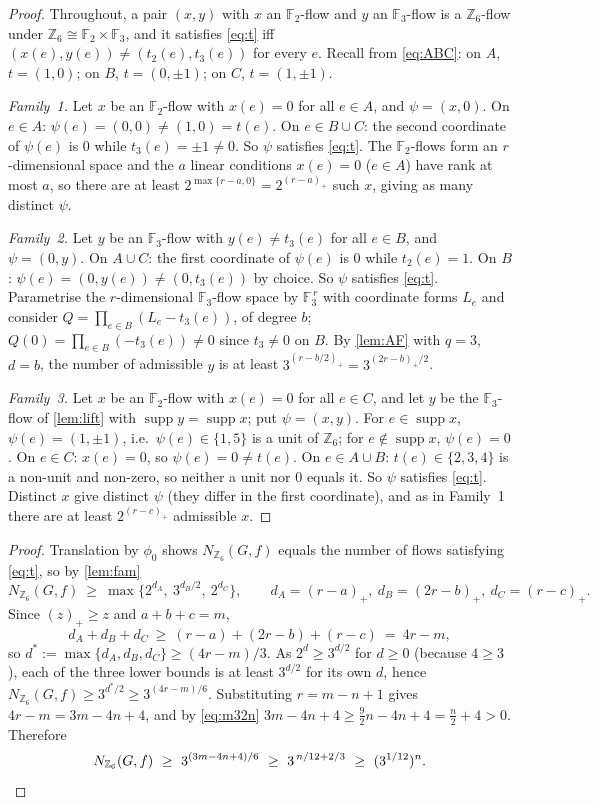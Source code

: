\documentclass[11pt,a4paper]{article}
\theoremstyle{plain}
\theoremstyle{definition}
\theoremstyle{remark}
\newcommand{\F}{{\mathbb F}}
\newcommand{\Z}{{\mathbb Z}}
\newcommand{\Nf}{N}
\DeclareMathOperator{\supp}{supp}
\newcommand{\pos}[1]{(#1)_{+}}
\begin{document}
\label{pf:fam}
\lemfam*
\begin{proof}
Throughout, a pair $(x,y)$ with $x$ an $\F_2$-flow and $y$ an $\F_3$-flow is a $\Z_6$-flow under $\Z_6\cong\F_2\times\F_3$, and it satisfies \eqref{eq:t} iff $(x(e),y(e))\ne(t_2(e),t_3(e))$ for every $e$. Recall from \eqref{eq:ABC}: on $A$, $t=(1,0)$; on $B$, $t=(0,\pm1)$; on $C$, $t=(1,\pm1)$.

\emph{Family~1.} Let $x$ be an $\F_2$-flow with $x(e)=0$ for all $e\in A$, and $\psi=(x,0)$. On $e\in A$: $\psi(e)=(0,0)\ne(1,0)=t(e)$. On $e\in B\cup C$: the second coordinate of $\psi(e)$ is $0$ while $t_3(e)=\pm1\ne0$. So $\psi$ satisfies \eqref{eq:t}. The $\F_2$-flows form an $r$-dimensional space and the $a$ linear conditions $x(e)=0$ ($e\in A$) have rank at most $a$, so there are at least $2^{\max\{r-a,0\}}=2^{\pos{r-a}}$ such $x$, giving as many distinct $\psi$.

\emph{Family~2.} Let $y$ be an $\F_3$-flow with $y(e)\ne t_3(e)$ for all $e\in B$, and $\psi=(0,y)$. On $A\cup C$: the first coordinate of $\psi(e)$ is $0$ while $t_2(e)=1$. On $B$: $\psi(e)=(0,y(e))\ne(0,t_3(e))$ by choice. So $\psi$ satisfies \eqref{eq:t}. Parametrise the $r$-dimensional $\F_3$-flow space by $\F_3^{\,r}$ with coordinate forms $L_e$ and consider $Q=\prod_{e\in B}(L_e-t_3(e))$, of degree $b$; $Q(0)=\prod_{e\in B}(-t_3(e))\ne0$ since $t_3\ne0$ on $B$. By \cref{lem:AF} with $q=3$, $d=b$, the number of admissible $y$ is at least $3^{\pos{r-b/2}}=3^{\pos{2r-b}/2}$.

\emph{Family~3.} Let $x$ be an $\F_2$-flow with $x(e)=0$ for all $e\in C$, and let $y$ be the $\F_3$-flow of \cref{lem:lift} with $\supp y=\supp x$; put $\psi=(x,y)$. For $e\in\supp x$, $\psi(e)=(1,\pm1)$, i.e.\ $\psi(e)\in\{1,5\}$ is a unit of $\Z_6$; for $e\notin\supp x$, $\psi(e)=0$. On $e\in C$: $x(e)=0$, so $\psi(e)=0\ne t(e)$. On $e\in A\cup B$: $t(e)\in\{2,3,4\}$ is a non-unit and non-zero, so neither a unit nor $0$ equals it. So $\psi$ satisfies \eqref{eq:t}. Distinct $x$ give distinct $\psi$ (they differ in the first coordinate), and as in Family~1 there are at least $2^{\pos{r-c}}$ admissible $x$.
\end{proof}

\label{pf:z6}
\propsix*
\begin{proof}
Translation by $\phi_0$ shows $\Nf_{\Z_6}(G,f)$ equals the number of flows satisfying \eqref{eq:t}, so by \cref{lem:fam}
\[
 \Nf_{\Z_6}(G,f)\ \ge\ \max\bigl\{2^{d_A},\ 3^{d_B/2},\ 2^{d_C}\bigr\},\qquad d_A=\pos{r-a},\ d_B=\pos{2r-b},\ d_C=\pos{r-c}.
\]
Since $\pos{z}\ge z$ and $a+b+c=m$,
\[
 d_A+d_B+d_C\ \ge\ (r-a)+(2r-b)+(r-c)\ =\ 4r-m,
\]
so $d^\ast:=\max\{d_A,d_B,d_C\}\ge(4r-m)/3$. As $2^{d}\ge3^{d/2}$ for $d\ge0$ (because $4\ge3$), each of the three lower bounds is at least $3^{d/2}$ for its own $d$, hence $\Nf_{\Z_6}(G,f)\ge3^{d^\ast/2}\ge3^{(4r-m)/6}$. Substituting $r=m-n+1$ gives $4r-m=3m-4n+4$, and by \eqref{eq:m32n} $3m-4n+4\ge\frac92n-4n+4=\frac n2+4>0$. Therefore
\[
 \Nf_{\Z_6}(G,f)\ \ge\ 3^{(3m-4n+4)/6}\ \ge\ 3^{\,n/12+2/3}\ \ge\ (3^{1/12})^{n}. \qedhere
\]
\end{proof}
\end{document}
